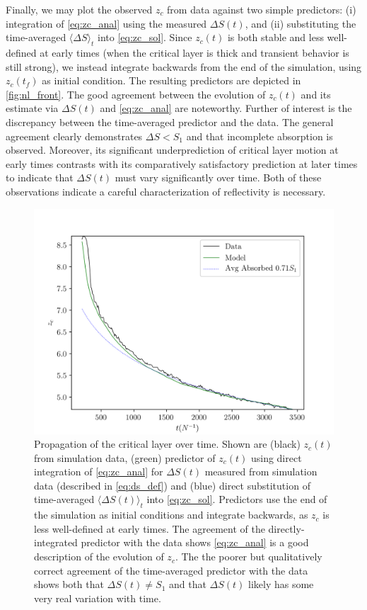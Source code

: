 \documentclass[
        fleqn,
        usenatbib,
    ]{mnras}
\newcommand*{\ev}[1]{\langle#1\rangle}
\begin{document}
Finally, we may plot the observed $z_c$ from data against two simple predictors:
(i) integration of \autoref{eq:zc_anal} using the measured $\Delta S(t)$, and
(ii) substituting the time-averaged $\ev{\Delta S}_t$ into \autoref{eq:zc_sol}.
Since $z_c(t)$ is both stable and less well-defined at early times (when the
critical layer is thick and transient behavior is still strong), we instead
integrate backwards from the end of the simulation, using $z_c(t_f)$ as initial
condition. The resulting predictors are depicted in \autoref{fig:nl_front}. The
good agreement between the evolution of $z_c(t)$ and its estimate via $\Delta
S(t)$ and \autoref{eq:zc_anal} are noteworthy. Further of interest is the
discrepancy between the time-averaged predictor and the data. The general
agreement clearly demonstrates $\Delta S < S_1$ and that incomplete absorption
is observed. Moreover, its significant underprediction of critical layer motion
at early times contrasts with its comparatively satisfactory prediction at later
times to indicate that $\Delta S(t)$ must vary significantly over time. Both of
these observations indicate a careful characterization of reflectivity is
necessary.

\begin{figure}[t]
    \centering
    \includegraphics[width=\columnwidth]{plots/nl_front.png}
    \caption{Propagation of the critical layer over time. Shown are (black)
    $z_c(t)$ from simulation data, (green) predictor of $z_c(t)$ using direct
    integration of \autoref{eq:zc_anal} for $\Delta S(t)$ measured from
    simulation data (described in \autoref{eq:ds_def}) and (blue) direct
    substitution of time-averaged $\ev{\Delta S(t)}_t$ into
    \autoref{eq:zc_sol}. Predictors use the end of the simulation as initial
    conditions and integrate backwards, as $z_c$ is less well-defined at early
    times. The agreement of the directly-integrated predictor with the data
    shows \autoref{eq:zc_anal} is a good description of the evolution of $z_c$.
    The the poorer but qualitatively correct agreement of the time-averaged
    predictor with the data shows both that $\Delta S(t) \neq S_1$ and that
    $\Delta S(t)$ likely has some very real variation with
    time.}\label{fig:nl_front}
\end{figure}
\end{document}
